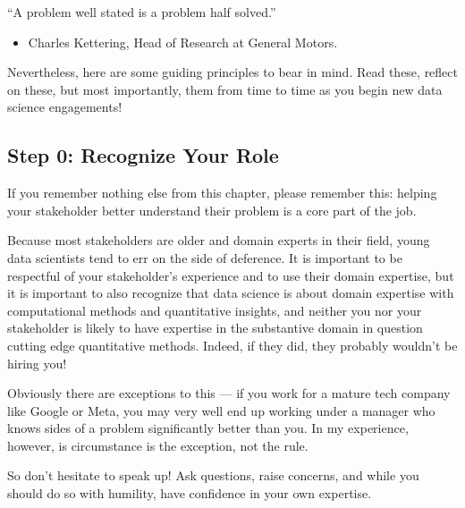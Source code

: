 \documentclass[letterpaper,10pt,english]{jupyterBook}
\begin{document}
\begin{sphinxShadowBox}

\sphinxAtStartPar
“A problem well stated is a problem half solved.”
\begin{itemize}
\item {} 
\sphinxAtStartPar
Charles Kettering, Head of Research at General Motors.

\end{itemize}
\end{sphinxShadowBox}

\sphinxAtStartPar
Nevertheless, here are some guiding principles to bear in mind. Read these, reflect on these, but most importantly,  them from time to time as you begin new data science engagements!


\subsection{Step 0: Recognize Your Role}
\label{\detokenize{10_introduction/30_solving_the_right_problem:step-0-recognize-your-role}}
\sphinxAtStartPar
If you remember nothing else from this chapter, please remember this: helping your stakeholder better understand their problem is a core part of the job.

\sphinxAtStartPar
Because most stakeholders are older and domain experts in their field, young data scientists tend to err on the side of deference. It is important to be respectful of your stakeholder’s experience and to use their domain expertise, but it is important to also recognize that data science is about  domain expertise with computational methods and quantitative insights, and neither you nor your stakeholder is likely to have expertise in  the substantive domain in question  cutting edge quantitative methods. Indeed, if they did, they probably wouldn’t be hiring you!%
\begin{footnote}[3]\sphinxAtStartFootnote
Obviously there are exceptions to this — if you work for a mature tech company like Google or Meta, you may very well end up working under a manager who knows sides of a problem significantly better than you. In my experience, however, is circumstance is the exception, not the rule.
%
\end{footnote} So don’t hesitate to speak up! Ask questions, raise concerns, and while you should do so with  humility, have confidence in your own expertise.
\end{document}
